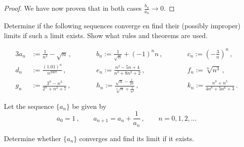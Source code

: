 \documentclass[week=3]{homework}
\begin{document}
\begin{questions}
\begin{parts}
\begin{proof}
	    		We have now proven that in both cases $\frac{b_n}{a_n} \to 0$.
	    	\end{proof}
	    \end{parts}
    
	    \question
	    Determine if the following sequences converge en find their (possibly improper) limits if such a limit exists. Show what rules and theorems are used.
	    
	    \begin{alignat*}{3}
	    a_n &:= \frac{1}{n^2} - \sqrt n\,,  \qquad &&b_n := \frac{1}{\sqrt n } + (-1)^nn\,,\qquad &&c_n := \left(-\frac{3}{n}\right)^n\,, \\
	    d_n &:= \frac{(1.01)^n}{n^{2007}}\,, \qquad &&e_n := \frac{n^2-5n+4}{n^3+8n^2+2}\,, \qquad &&f_n := \sqrt[n]{n^3}\,, \\
	    g_n &:= \frac{3^n - n^3}{2^n + n^2 + 7}\,, \qquad &&h_n := \frac{\sqrt n - \frac{1}{2n}}{\sqrt[3]{n} + \frac{1}{n^2}}\,, \qquad &&k_n := \frac{n^8 + n^5}{4n^8 + 5n^6 + 3}\,.
	    \end{alignat*}
	    \begin{parts}
	    	\part
	    	
	    	\part
	    	
	    \end{parts}
    
	    \question Let the sequence $\{a_n\}$ be given by
	    \[
		    a_0 = 1\,, \qquad a_{n+1} = a_n + \frac{1}{a_n}\,, \qquad n = 0,1,2,\ldots
	    \]
	    
	    Determine whether $\{a_n\}$ converges and find its limit if it exists.
	    
     \end{questions}
\end{document}
